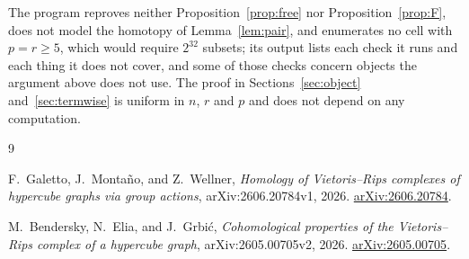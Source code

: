 \documentclass[11pt]{amsart}
\theoremstyle{definition}
\theoremstyle{remark}
\numberwithin{equation}{section}
\begin{document}
The program reproves neither Proposition~\ref{prop:free} nor
Proposition~\ref{prop:F}, does not model the homotopy of Lemma~\ref{lem:pair},
and enumerates no cell with $p=r\ge5$, which would require $2^{32}$ subsets;
its output lists each check it runs and each thing it does not cover, and some
of those checks concern objects the argument above does not use. The proof in
Sections~\ref{sec:object} and~\ref{sec:termwise} is uniform in $n$, $r$ and $p$
and does not depend on any computation.

\begin{thebibliography}{9}

F.~Galetto, J.~Monta\~no, and Z.~Wellner,
\emph{Homology of Vietoris--Rips complexes of hypercube graphs via group
actions},
arXiv:2606.20784v1, 2026.
\href{https://arxiv.org/abs/2606.20784}{arXiv:2606.20784}.

M.~Bendersky, N.~Elia, and J.~Grbi\'c,
\emph{Cohomological properties of the Vietoris--Rips complex of a hypercube
graph},
arXiv:2605.00705v2, 2026.
\href{https://arxiv.org/abs/2605.00705}{arXiv:2605.00705}.

\end{thebibliography}
\end{document}
